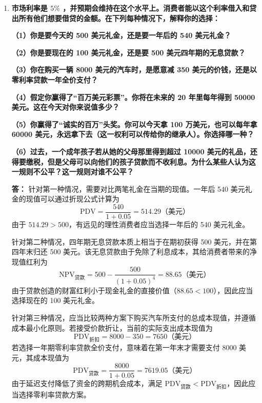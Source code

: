 \begin{enumerate}[label=\textbf{\arabic*.}, leftmargin=*]
		通过对前期的亏损现金流进行分项折现，并对中后期的年金流运用等比数列求和公式进行加总，可以精确计算出该投资项目的综合净现值
		\[
		\text{NPV} \approx -0.338 \text{（百万美元）}
		\]
		由于该项目的风险调整净现值严格小于零，意味着该工厂创造的未来收益无法覆盖其初始资本投入与跨期机会成本。因此，该项投资在经济学上是不值得的。
		\newpage
		\item \textbf{市场利率是 $5\%$ ，并预期会维持在这个水平上。消费者能以这个利率借入和贷出所有他们想要借贷的金额。在下列每种情况下，解释你的选择：}
		\par \textbf{（1）你是要今天的 500 美元礼金，还是要一年后的 540 美元礼金？}
		\par \textbf{（2）你是要现在的 100 美元礼金，还是要 500 美元四年期的无息贷款？}
		\par \textbf{（3）你在购买一辆 8000 美元的汽车时，是愿意减 350 美元的价钱，还是以零利率贷款一年全价支付？}
		\par \textbf{（4）假定你赢得了“百万美元彩票”。你将在未来的 20 年里每年得到 50000 美元。这在今天对你来说值多少？}
		\par \textbf{（5）你赢得了“诚实的百万”头奖。你可以今天拿 100 万美元，也可以每年拿 60000 美元，永远拿下去（这一权利可以传给你的继承人）。你选择哪一种？}
		\par \textbf{（6）过去，一个成年孩子若从她的父母那里得到超过 10000 美元的礼品，还得要缴税，但是父母可以向他们的孩子贷款而不收利息。为什么某些人认为这一规则不公平？这一规则对谁不公平？}
		
		\textbf{答：}
		针对第一种情况，需要对比两笔礼金在当期的现值。一年后 540 美元礼金的现值可以通过折现公式计算为
		\[
		\text{PDV} = \frac{540}{1 + 0.05} = 514.29 \text{（美元）}
		\]
		由于 $514.29 > 500$，有远见的理性消费者应当选择一年后的 540 美元礼金。
		
		针对第二种情况，四年期无息贷款本质上相当于在期初获得 500 美元，并在第四年末归还 500 美元。该无息贷款由于免除了利息成本，其给消费者带来的净现值红利为
		\[
		\text{NPV}_{\text{贷款}} = 500 - \frac{500}{(1+0.05)^4} = 88.65 \text{（美元）}
		\]
		由于贷款创造的财富红利小于现金礼金的直接价值（$88.65 < 100$），因此应当选择现在的 100 美元礼金。
		
		针对第三种情况，应当比较两种方案下购买汽车所支付的总成本现值，并遵循成本最小化原则。若接受价款折让，当前的实际支出成本现值为
		\[
		\text{PDV}_{\text{折扣}} = 8000 - 350 = 7650 \text{（美元）}
		\]
		若选择一年期零利率贷款全价支付，意味着在第一年末才需要支付 8000 美元，其成本现值为
		\[
		\text{PDV}_{\text{贷款}} = \frac{8000}{1+0.05} = 7619.05 \text{（美元）}
		\]
		由于延迟支付降低了资金的跨期机会成本，满足 $\text{PDV}_{\text{贷款}} < \text{PDV}_{\text{折扣}}$，因此应当选择零利率贷款方案。
		

\end{enumerate}
